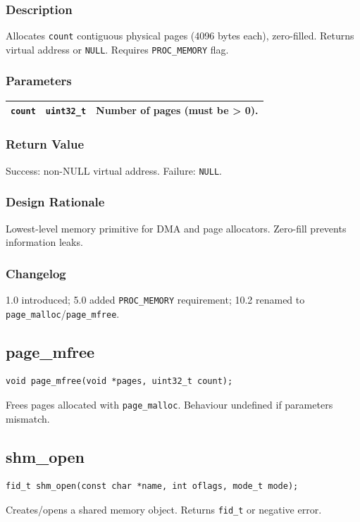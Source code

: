 \documentclass[12pt,a4paper]{article}
\begin{document}
\subsubsection{Description}
Allocates \texttt{count} contiguous physical pages (4096 bytes each), zero-filled. Returns virtual address or \texttt{NULL}. Requires \texttt{PROC\_MEMORY} flag.

\subsubsection{Parameters}
\begin{tabularx}{\textwidth}{|l|l|X|}
\hline
\verb|count| & \verb|uint32_t| & Number of pages (must be > 0). \\
\hline
\end{tabularx}

\subsubsection{Return Value}
Success: non-NULL virtual address. Failure: \texttt{NULL}.

\subsubsection{Design Rationale}
Lowest-level memory primitive for DMA and page allocators. Zero-fill prevents information leaks.

\subsubsection{Changelog}
1.0 introduced; 5.0 added \texttt{PROC\_MEMORY} requirement; 10.2 renamed to \texttt{page\_malloc}/\texttt{page\_mfree}.

\subsection{page\_mfree}
\begin{lstlisting}
void page_mfree(void *pages, uint32_t count);
\end{lstlisting}
Frees pages allocated with \texttt{page\_malloc}. Behaviour undefined if parameters mismatch.

\subsection{shm\_open}
\begin{lstlisting}
fid_t shm_open(const char *name, int oflags, mode_t mode);
\end{lstlisting}
Creates/opens a shared memory object. Returns \texttt{fid\_t} or negative error.
\end{document}
